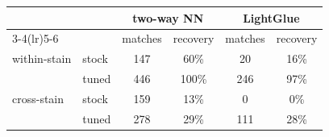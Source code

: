 \begin{tabular}{llcccc}
\toprule
& & \multicolumn{2}{c}{two-way NN} & \multicolumn{2}{c}{LightGlue} \\
\cmidrule(lr){3-4}\cmidrule(lr){5-6}
& & matches & recovery & matches & recovery \\
\midrule
within-stain & stock & 147 & 60\% & 20 & 16\% \\
 & tuned & 446 & 100\% & 246 & 97\% \\
\midrule
cross-stain & stock & 159 & 13\% & 0 & 0\% \\
 & tuned & 278 & 29\% & 111 & 28\% \\
\bottomrule
\end{tabular}
